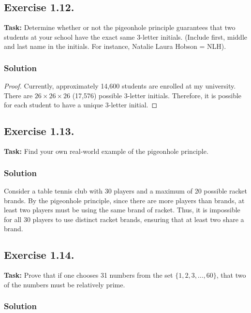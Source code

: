 \documentclass{article}
\begin{document}
\subsection{Exercise 1.12.}
\textbf{Task:} Determine whether or not the pigeonhole principle guarantees that two students at your school have the exact same 3-letter initials. (Include first, middle and last name in the initials. For instance, Natalie Laura Hobson = NLH).

\subsubsection*{Solution}

\begin{proof}
Currently, approximately 14,600 students are enrolled at my university. There are $26 \times 26 \times 26$ (17,576) possible 3-letter initials. Therefore, it is possible for each student to have a unique 3-letter initial.
\end{proof}

\newpage 

\subsection{Exercise 1.13.}
\textbf{Task:} Find your own real-world example of the pigeonhole principle.

\subsubsection*{Solution}

Consider a table tennis club with 30 players and a maximum of 20 possible racket brands. By the pigeonhole principle, since there are more players than brands, at least two players must be using the same brand of racket. Thus, it is impossible for all 30 players to use distinct racket brands, ensuring that at least two share a brand.

\subsection{Exercise 1.14.}
\textbf{Task:} Prove that if one chooses 31 numbers from the set $\{1,2,3,\dots,60\}$, that two of the numbers must be relatively prime.

\subsubsection*{Solution}
\end{document}

